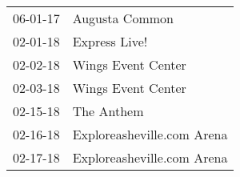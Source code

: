 \begin{supertabular}{p{0.07\textwidth}p{0.23\textwidth}}
 06-01-17 &              Augusta Common \\
 02-01-18 &               Express Live! \\
 02-02-18 &          Wings Event Center \\
 02-03-18 &          Wings Event Center \\
 02-15-18 &                  The Anthem \\
 02-16-18 &  Exploreasheville.com Arena \\
 02-17-18 &  Exploreasheville.com Arena \\
\end{supertabular}
